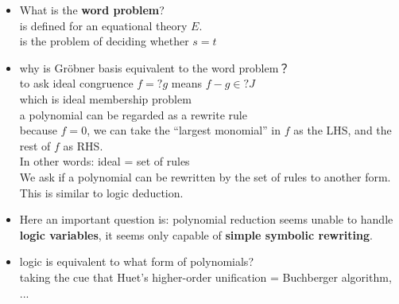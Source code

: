 \begin{itemize}
	\item What is the \textbf{word problem}? \\
	is defined for an equational theory $E$. \\
	is the problem of deciding whether $s = t$
	
	\item why is Gr\"{o}bner basis equivalent to the word problem？ \\
	to ask ideal congruence $f =? g$ means $f - g \in? J$ \\
	which is ideal membership problem \\
	a polynomial can be regarded as a rewrite rule \\
	because $f = 0$, we can take the ``largest monomial'' in $f$ as the LHS, and the rest of $f$ as RHS. \\
	In other words:  ideal = set of rules \\
	We ask if a polynomial can be rewritten by the set of rules to another form.  \\
	This is similar to logic deduction.
	
	\item Here an important question is: polynomial reduction seems unable to handle \textbf{logic variables}, it seems only capable of \textbf{simple symbolic rewriting}.
	
	\item logic is equivalent to what form of polynomials? \\
	taking the cue that Huet's higher-order unification = Buchberger algorithm, ...
\end{itemize}

